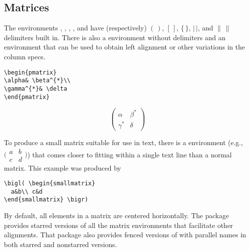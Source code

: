 \subsection{Matrices}\label{ss:matrix}

The environments , , ,
, and  have (respectively) $(\,)$, $[\,]$,
$\lbrace\,\rbrace$, $\lvert\,\rvert$, and $\lVert\,\rVert$ delimiters
built in. There is also a  environment without delimiters
and an  environment that can be used to obtain left alignment
or other variations in the column specs.
\begin{center}
\begin{minipage}{.4\columnwidth}
\begin{verbatim}
\begin{pmatrix}
\alpha& \beta^{*}\\
\gamma^{*}& \delta
\end{pmatrix}
\end{verbatim}
\end{minipage}
\qquad
\begin{minipage}{.4\columnwidth}
\[
\begin{pmatrix}
\alpha& \beta^{*}\\
\gamma^{*}& \delta
\end{pmatrix}
\]
\end{minipage}
\end{center}
To produce a small matrix suitable for use in text, there is a
 environment (e.g.,
\begin{math}
\bigl( \begin{smallmatrix}
  a&b\\ c&d
\end{smallmatrix} \bigr)
\end{math})
that comes closer to fitting within a single text line than a normal
matrix. This example was produced by
\begin{verbatim}
\bigl( \begin{smallmatrix}
  a&b\\ c&d
\end{smallmatrix} \bigr)
\end{verbatim}
By default, all elements in a matrix are centered horizontally.
The  package provides starred versions of all the matrix
environments that facilitate other alignments.  That package also provides
fenced versions of  with parallel names in both starred
and nonstarred versions.

